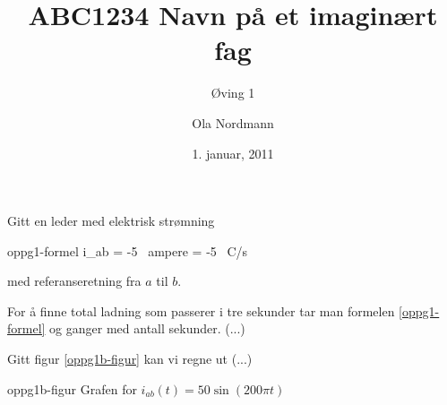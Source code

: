 \documentclass[a4paper]{article}
\title{ABC1234 Navn på et imaginært fag}
\subtitle{Øving 1}
\author{Ola Nordmann}
\date{1. januar, 2011}
\begin{document}
  \maketitle

  Gitt en leder med elektrisk strømning

  \begin{formel}{oppg1-formel}
    i_{ab} = -5 \, \textrm{ampere} = -5 \, \textrm{C/s}
  \end{formel}

  med referanseretning fra $a$ til $b$.

  For å finne total ladning som passerer i tre sekunder tar man
  formelen \ref{oppg1-formel} og ganger med antall sekunder. (...)

  Gitt figur \ref{oppg1b-figur} kan vi regne ut (...)

         {oppg1b-figur}
         {Grafen for $i_{ab}(t) = 50 \sin(200 \pi t)$}
\end{document}
